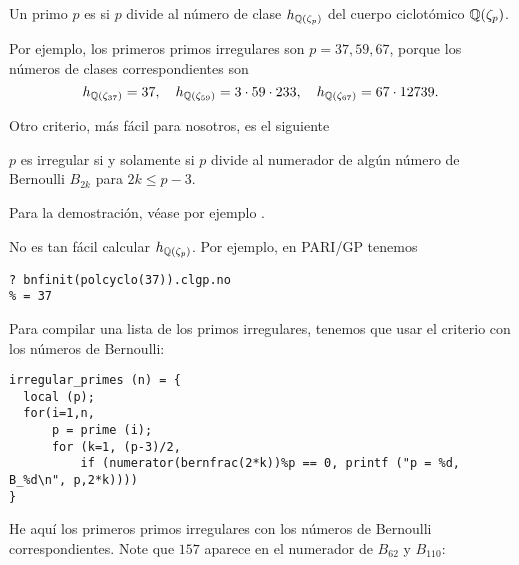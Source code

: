 \documentclass{article}
\numberwithin{equation}{section}
\theoremstyle{definition}
\begin{document}
\begin{definicion}
  Un primo $p$ es  si $p$ divide al número de clase
  $h_{\mathbb{Q} (\zeta_p)}$ del cuerpo ciclotómico $\mathbb{Q} (\zeta_p)$.
\end{definicion}

Por ejemplo, los primeros primos irregulares son $p = 37, 59, 67$, porque los
números de clases correspondientes son
\[ h_{\mathbb{Q} (\zeta_{37})} = 37, \quad
  h_{\mathbb{Q} (\zeta_{59})} = 3\cdot 59\cdot 233, \quad
  h_{\mathbb{Q} (\zeta_{67})} = 67\cdot 12739. \]

Otro criterio, más fácil para nosotros, es el siguiente

\begin{hecho}[Kummer, 1850]
  $p$ es irregular si y solamente si $p$ divide al numerador de algún número de
  Bernoulli $B_{2k}$ para $2k \le p-3$.
\end{hecho}

\noindent Para la demostración, véase por ejemplo
\cite[Chapter 5]{Washington-1997}.

\begin{shaded}
  \small\noindent No es tan fácil calcular $h_{\mathbb{Q} (\zeta_p)}$. Por ejemplo,
  en PARI/GP tenemos

\begin{verbatim}
? bnfinit(polcyclo(37)).clgp.no
% = 37
\end{verbatim}

  \noindent Para compilar una lista de los primos irregulares, tenemos que usar
  el criterio con los números de Bernoulli:

\begin{verbatim}
irregular_primes (n) = {
  local (p);
  for(i=1,n,
      p = prime (i);
      for (k=1, (p-3)/2,
          if (numerator(bernfrac(2*k))%p == 0, printf ("p = %d, B_%d\n", p,2*k))))
}
\end{verbatim}
\end{shaded}

\pagebreak

He aquí los primeros primos irregulares con los números de Bernoulli
correspondientes. Note que $157$ aparece en el numerador de $B_{62}$
y $B_{110}$:
\end{document}
